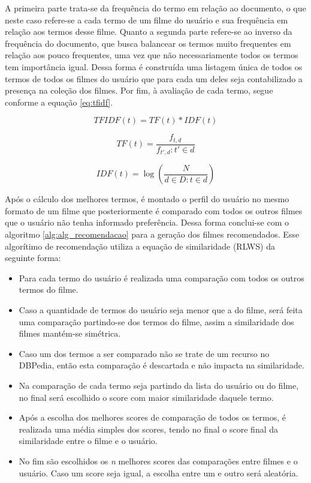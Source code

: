 A primeira parte trata-se da frequência do termo em relação ao documento, o que neste caso refere-se a cada termo de um filme do usuário e sua frequência em relação aos termos desse filme. Quanto a segunda parte refere-se ao inverso da frequência do documento, que busca balancear os termos muito frequentes em relação aos pouco frequentes, uma vez que não necessariamente todos os termos tem importância igual. Dessa forma é construída uma listagem única de todos os termos de todos os filmes do usuário que para cada um deles seja contabilizado a presença na coleção dos filmes. Por fim, à avaliação de cada termo, segue conforme a equação {\ref{eq:tfidf}}.

\begin{equation}
	TFIDF(t) = TF(t) * IDF(t)
\label{eq:tfidf}
\end{equation}

\begin{equation}
	TF(t) = \frac{f_{t,d}}{f_{t',d} : t' \in d}
\label{eq:tf}
\end{equation}

\begin{equation}
	IDF(t) = \log (\frac{N}{d \in D : t \in d})
\label{eq:idf}
\end{equation}

Após o cálculo dos melhores termos, é montado o perfil do usuário no mesmo formato de um filme que posteriormente é comparado com todos os outros filmes que o usuário não tenha informado preferência. Dessa forma conclui-se com o algoritmo \ref{alg:alg_recomendacao} para a geração dos filmes recomendados. Esse algorítimo de recomendação utiliza a equação de similaridade (\ac{RLWS}) da seguinte forma:

\begin{itemize}
	\item{Para cada termo do usuário é realizada uma comparação com todos os outros termos do filme.}
	\item{Caso a quantidade de termos do usuário seja menor que a do filme, será feita uma comparação partindo-se dos termos do filme, assim a similaridade dos filmes mantém-se simétrica.}
	\item{Caso um dos termos a ser comparado não se trate de um recurso no DBPedia, então esta comparação é descartada e não impacta na similaridade.}
	\item{Na comparação de cada termo seja partindo da lista do usuário ou do filme, no final será escolhido o score com maior similaridade daquele termo.}
	\item{Após a escolha dos melhores scores de comparação de todos os termos, é realizada uma média simples dos scores, tendo no final o score final da similaridade entre o filme e o usuário.}
	\item{No fim são escolhidos os \textit{n} melhores scores das comparações entre filmes e o usuário. Caso um score seja igual, a escolha entre um e outro será aleatória.}
\end{itemize}

